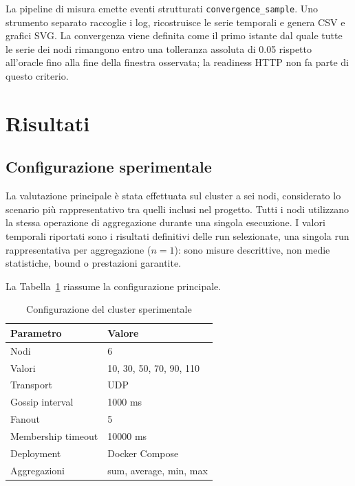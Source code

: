 \documentclass[conference]{IEEEtran}
\begin{document}
La pipeline di misura emette eventi strutturati \texttt{convergence\_sample}. Uno strumento separato raccoglie i log, ricostruisce le serie temporali e genera CSV e grafici SVG. La convergenza viene definita come il primo istante dal quale tutte le serie dei nodi rimangono entro una tolleranza assoluta di 0.05 rispetto all'oracle fino alla fine della finestra osservata; la readiness HTTP non fa parte di questo criterio.

\section{Risultati}

\subsection{Configurazione sperimentale}

La valutazione principale è stata effettuata sul cluster a sei nodi, considerato lo scenario più rappresentativo tra quelli inclusi nel progetto. Tutti i nodi utilizzano la stessa operazione di aggregazione durante una singola esecuzione. I valori temporali riportati sono i risultati definitivi delle run selezionate, una singola run rappresentativa per aggregazione ($n=1$): sono misure descrittive, non medie statistiche, bound o prestazioni garantite.

La Tabella~\ref{tab:setup} riassume la configurazione principale.

\begin{table}[t]
\centering
\caption{Configurazione del cluster sperimentale}
\label{tab:setup}
\footnotesize
\begin{tabular}{@{}ll@{}}
\toprule
\textbf{Parametro} & \textbf{Valore} \\
\midrule
Nodi & 6 \\
Valori & 10, 30, 50, 70, 90, 110 \\
Transport & UDP \\
Gossip interval & 1000 ms \\
Fanout & 5 \\
Membership timeout & 10000 ms \\
Deployment & Docker Compose \\
Aggregazioni & sum, average, min, max \\
\bottomrule
\end{tabular}
\end{table}
\end{document}
